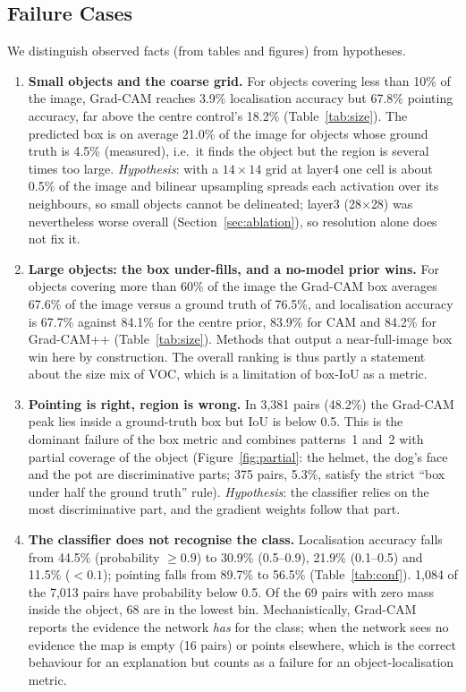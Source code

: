 \documentclass[11pt,a4paper]{article}
\newcommand{\GC}{Grad-CAM}
\begin{document}
\subsection{Failure Cases}\label{sec:failures}
We distinguish observed facts (from tables and figures) from hypotheses.
\begin{enumerate}[leftmargin=*]
\item \textbf{Small objects and the coarse grid.} For objects covering less than 10\% of the image, \GC{} reaches 3.9\% localisation accuracy but 67.8\% pointing accuracy, far above the centre control's 18.2\% (Table~\ref{tab:size}). The predicted box is on average 21.0\% of the image for objects whose ground truth is 4.5\% (measured), i.e.\ it finds the object but the region is several times too large. \emph{Hypothesis}: with a $14\times14$ grid at layer4 one cell is about 0.5\% of the image and bilinear upsampling spreads each activation over its neighbours, so small objects cannot be delineated; layer3 (28$\times$28) was nevertheless worse overall (Section~\ref{sec:ablation}), so resolution alone does not fix it.
\item \textbf{Large objects: the box under-fills, and a no-model prior wins.} For objects covering more than 60\% of the image the \GC{} box averages 67.6\% of the image versus a ground truth of 76.5\%, and localisation accuracy is 67.7\% against 84.1\% for the centre prior, 83.9\% for CAM and 84.2\% for Grad-CAM++ (Table~\ref{tab:size}). Methods that output a near-full-image box win here by construction. The overall ranking is thus partly a statement about the size mix of VOC, which is a limitation of box-IoU as a metric.
\item \textbf{Pointing is right, region is wrong.} In 3{,}381 pairs (48.2\%) the \GC{} peak lies inside a ground-truth box but IoU is below 0.5. This is the dominant failure of the box metric and combines patterns~1 and~2 with partial coverage of the object (Figure~\ref{fig:partial}: the helmet, the dog's face and the pot are discriminative parts; 375 pairs, 5.3\%, satisfy the strict ``box under half the ground truth'' rule). \emph{Hypothesis}: the classifier relies on the most discriminative part, and the gradient weights follow that part.
\item \textbf{The classifier does not recognise the class.} Localisation accuracy falls from 44.5\% (probability $\ge0.9$) to 30.9\% (0.5--0.9), 21.9\% (0.1--0.5) and 11.5\% ($<0.1$); pointing falls from 89.7\% to 56.5\% (Table~\ref{tab:conf}). 1{,}084 of the 7{,}013 pairs have probability below 0.5. Of the 69 pairs with zero mass inside the object, 68 are in the lowest bin. Mechanistically, \GC{} reports the evidence the network \emph{has} for the class; when the network sees no evidence the map is empty (16 pairs) or points elsewhere, which is the correct behaviour for an explanation but counts as a failure for an object-localisation metric.

\end{enumerate}
\end{document}
